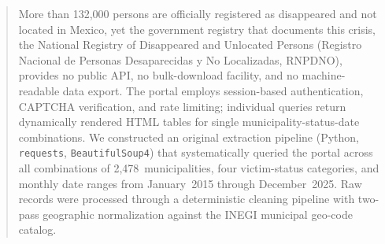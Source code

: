 \documentclass[3p]{elsarticle}
\begin{document}
\begin{frontmatter}
\begin{abstract}
  More than 132{,}000 persons are officially registered as disappeared and not located in Mexico, yet the government registry that documents
  this crisis, the National Registry of Disappeared and Unlocated                                                                                                                             
  Persons (Registro Nacional de Personas Desaparecidas y No                                                                                                                                 
  Localizadas, RNPDNO), provides no public API, no bulk-download                                                                                                                              
  facility, and no machine-readable data export.
  The portal employs session-based authentication, CAPTCHA                                                                                                                                    
  verification, and rate limiting; individual queries return                                                                                                                                
  dynamically rendered HTML tables for single                                                                                                                                                 
  municipality-status-date combinations.
  We constructed an original extraction pipeline                                                                                                                                              
  (Python, \texttt{requests}, \texttt{BeautifulSoup4}) that                                                                                                                                 
  systematically queried the portal across all combinations of
  2{,}478~municipalities, four victim-status categories, and monthly
  date ranges from January~2015 through December~2025.                                                                                                                                        
  Raw records were processed through a deterministic cleaning pipeline
  with two-pass geographic normalization against the INEGI municipal                                                                                                                          
  geo-code catalog.                                                                                                                                                                         
                                                                                                                                                                                              

\end{abstract}
\end{frontmatter}
\end{document}
